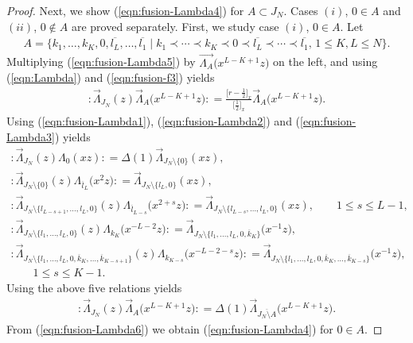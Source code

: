 \documentclass[pdftex]{sigma}
\numberwithin{equation}{section}
\begin{document}
\begin{proof}
Next, we show (\ref{eqn:fusion-Lambda4}) for $A \subset J_N$.
Cases $(i)$, $0 \in A$ and~$(ii)$, $0 \notin A$ are proved separately.
First, we study case $(i)$, $0 \in A$. Let
\begin{gather*}
A=\{k_1, \dots,k_K, 0, \overline{l_L}, \dots, \overline{l_1} \mid
k_1\prec \cdots \prec k_K \prec 0 \prec\overline{l_L} \prec \cdots \prec \overline{l_1},\,
1\leq K, L \leq N\}.
\end{gather*}
Multiplying (\ref{eqn:fusion-Lambda5}) by $\overrightarrow{\Lambda_A}\big(x^{L-K+1}z\big)$
on the left, and using (\ref{eqn:Lambda}) and (\ref{eqn:fusion-f3}) yields
\begin{gather}
{:}\overrightarrow{\Lambda}_{J_N}(z)
\overrightarrow{\Lambda}_A\big(x^{L-K+1}z\big){:}=\frac{\big[r-\frac{1}{2}\big]_x}{\big[\frac{1}{2}\big]_x}
\overrightarrow{\Lambda}_A\big(x^{L-K+1}z\big).
\label{eqn:fusion-Lambda6}
\end{gather}
Using (\ref{eqn:fusion-Lambda1}), (\ref{eqn:fusion-Lambda2}) and
(\ref{eqn:fusion-Lambda3}) yields
\begin{gather*}
{:}\overrightarrow{\Lambda}_{J_N}(z)\Lambda_0(xz){:}
=\Delta(1)\overrightarrow{\Lambda}_{J_N{\setminus} \{0\}}(xz),
\\
{:}\overrightarrow{\Lambda}_{J_N{\setminus} \{0\}}(z)
\Lambda_{\overline{l}_L}\big(x^2z\big){:}
=\overrightarrow{\Lambda}_{J_N{\setminus} \{l_L, 0\}}(xz),
\\
{:}\overrightarrow{\Lambda}_{J_N{\setminus} \{l_{L-s+1},\dots, l_{L}, 0\}}(z)
\Lambda_{\overline{l}_{L-s}}\big(x^{2+s}z\big){:}
=\overrightarrow{\Lambda}_{J_N{\setminus} \{l_{L-s},\dots, l_L, 0\}}(xz),\qquad
1\leq s \leq L-1,
\\
{:}\overrightarrow{\Lambda}_{J_N{\setminus} \{l_1, \dots, l_L, 0\}}(z)
\Lambda_{{k}_K}\big(x^{-L-2}z\big){:}
=\overrightarrow{\Lambda}_{J_N{\setminus} \{l_1,\dots, l_L, 0, \overline{k}_K\}}\big(x^{-1}z\big),
\\
{:}\overrightarrow{\Lambda}_{J_N{\setminus} \{l_1,\dots, l_{L}, 0, \overline{k}_K, \dots, \overline{k}_{K-s+1}\}}(z)
\Lambda_{{k}_{K-s}}\big(x^{-L-2-s}z\big){:}
=\overrightarrow{\Lambda}_{J_N{\setminus} \{l_{1},\dots, l_L, 0, \overline{k}_K,\dots, \overline{k}_{K-s}\}}\big(x^{-1}z\big),
\\ \qquad
1\leq s \leq K-1.
\end{gather*}
Using the above five relations yields
\begin{gather*}
{:}\overrightarrow{\Lambda}_{J_N}(z)\overrightarrow{\Lambda}_A\big(x^{L-K+1}z\big){:}=
\Delta(1)\overrightarrow{\Lambda}_{\overline{J_N \setminus A}}\big(x^{L-K+1}z\big).
\end{gather*}
From (\ref{eqn:fusion-Lambda6})
we obtain (\ref{eqn:fusion-Lambda4}) for $0 \in A$.


\end{proof}
\end{document}
